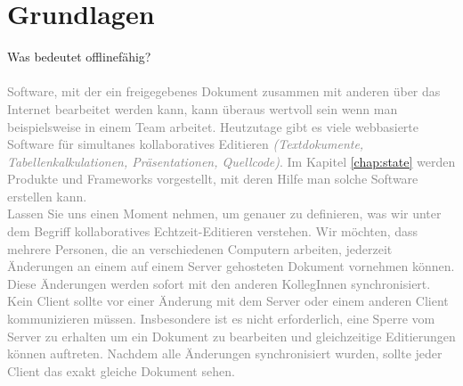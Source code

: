 \chapter{\label{chap:grundlagen}Grundlagen}
Was bedeutet offlinefähig?\\\\
\textcolor{gray}{Software, mit der ein freigegebenes Dokument zusammen mit anderen über das Internet bearbeitet werden kann, kann überaus wertvoll sein wenn man beispielsweise in einem Team arbeitet. Heutzutage gibt es viele webbasierte Software für simultanes kollaboratives Editieren \textit{(Textdokumente, Tabellenkalkulationen, Präsentationen, Quellcode)}. Im Kapitel \ref{chap:state} werden Produkte und Frameworks vorgestellt, mit deren Hilfe man solche Software erstellen kann.\\
  Lassen Sie uns einen Moment nehmen, um genauer zu definieren, was wir unter dem Begriff kollaboratives Echtzeit-Editieren verstehen.
Wir möchten, dass mehrere Personen, die an verschiedenen Computern arbeiten, jederzeit Änderungen an einem auf einem Server gehosteten Dokument vornehmen können. Diese Änderungen werden sofort mit den anderen KollegInnen synchronisiert. Kein Client sollte vor einer Änderung mit dem Server oder einem anderen Client kommunizieren müssen. Insbesondere ist es nicht erforderlich, eine Sperre vom Server zu erhalten um ein Dokument zu bearbeiten und gleichzeitige Editierungen können auftreten. Nachdem alle Änderungen synchronisiert wurden, sollte jeder Client das exakt gleiche Dokument sehen.}
%
%
